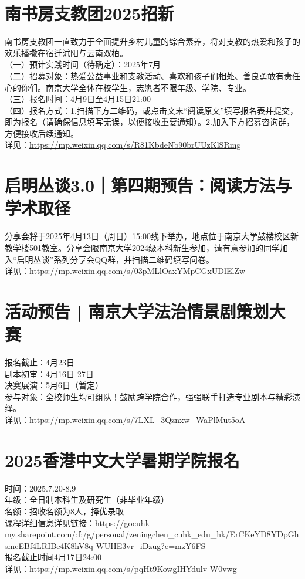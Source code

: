 \documentclass[letterpaper, 12pt]{article}
\begin{document}
\begin{multicols}{2}
\section{南书房支教团2025招新}
南书房支教团一直致力于全面提升乡村儿童的综合素养，将对支教的热爱和孩子的欢乐播撒在宿迁沭阳与云南双柏。
\\（一）预计实践时间（待确定）：2025年7月
\\（二）招募对象：热爱公益事业和支教活动、喜欢和孩子们相处、善良勇敢有责任心的你们。南京大学全体在校学生，志愿者不限年级、学院、专业。
\\（三）报名时间：4月9日至4月15日21:00
\\（四）报名方式：1.扫描下方二维码，或点击文末“阅读原文”填写报名表并提交，即为报名（请确保信息填写无误，以便接收重要通知）。2.加入下方招募咨询群，方便接收后续通知。
\\详见：\url{https://mp.weixin.qq.com/s/R81KbdeNb90brUUzKlSRmg}

\section{启明丛谈3.0｜第四期预告：阅读方法与学术取径}
分享会将于2025年4月13日（周日）15:00线下举办，地点位于南京大学鼓楼校区新教学楼501教室。分享会限南京大学2024级本科新生参加，请有意参加的同学加入“启明丛谈”系列分享会QQ群，并扫描二维码填写问卷。
\\详见：\url{https://mp.weixin.qq.com/s/03pMLlOaxYMpCGxUDlElZw}

\section{活动预告 | 南京大学法治情景剧策划大赛}
报名截止：4月23日
\\剧本初审：4月16日-27日  
\\决赛展演：5月6日（暂定）
\\参与对象：全校师生均可组队！鼓励跨学院合作，强强联手打造专业剧本与精彩演绎。
\\详见：\url{https://mp.weixin.qq.com/s/7LXL_3Qznxw_WaPlMut5oA}


\section{2025香港中文大学暑期学院报名}
时间：2025.7.20-8.9
\\年级：全日制本科生及研究生（非毕业年级）
\\名额：招收名额为8人，择优录取
\\课程详细信息详见链接：https://gocuhk-my.sharepoint.com/:f:/g/personal/zeningchen\_cuhk\_edu\_hk/ErCKeYD8YDpGhsmcEBf4LRIBe4K8hV8q-WUHE3vr\_iDzug?e=mzY6FS
\\报名截止时间4月17日24:00
\\详见：\url{https://mp.weixin.qq.com/s/pqHt9KowgIHYdulv-W0vwg}

\end{multicols}
\end{document}
